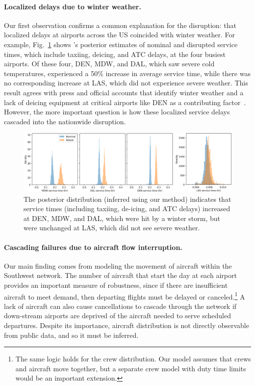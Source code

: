 \paragraph{Localized delays due to winter weather.} Our first observation confirms a common explanation for the disruption: that localized delays at airports across the US coincided with winter weather. For example, Fig.~\ref{ch:icml:fig:wn_service_times} shows \ouralg{}'s posterior estimates of nominal and disrupted service times, which include taxiing, deicing, and ATC delays, at the four busiest airports. Of these four, DEN, MDW, and DAL, which saw severe cold temperatures, experienced a 50\% increase in average service time, while there was no corresponding increase at LAS, which did not experience severe weather.
%
This result agrees with press and official accounts that identify winter weather and a lack of deicing equipment at critical airports like DEN as a contributing factor~\cite{southwestairlinesFinalSummaryAction2023,cramerWhatCausedChaos2022}. However, the more important question is how these localized service delays cascaded into the nationwide disruption.

\begin{figure}[t]
    \centering
    \includegraphics[width=\linewidth]{images/icml/wn/wn_top4_service_times.pdf}
    \caption{The posterior distribution (inferred using our method) indicates that service times (including taxiing, de-icing, and ATC delays) increased at DEN, MDW, and DAL, which were hit by a winter storm, but were unchanged at LAS, which did not see severe weather.}
    \label{ch:icml:fig:wn_service_times}
\end{figure}

\paragraph{Cascading failures due to aircraft flow interruption.}
%
Our main finding comes from modeling the movement of aircraft within the Southwest network. The number of aircraft that start the day at each airport provides an important measure of robustness, since if there are insufficient aircraft to meet demand, then departing flights must be delayed or canceled.\footnote{The same logic holds for the crew distribution. Our model assumes that crews and aircraft move together, but a separate crew model with duty time limits would be an important extension.} A lack of aircraft can also cause cancellations to cascade through the network if down-stream airports are deprived of the aircraft needed to serve scheduled departures. Despite its importance, aircraft distribution is not directly observable from public data, and so it must be inferred.

